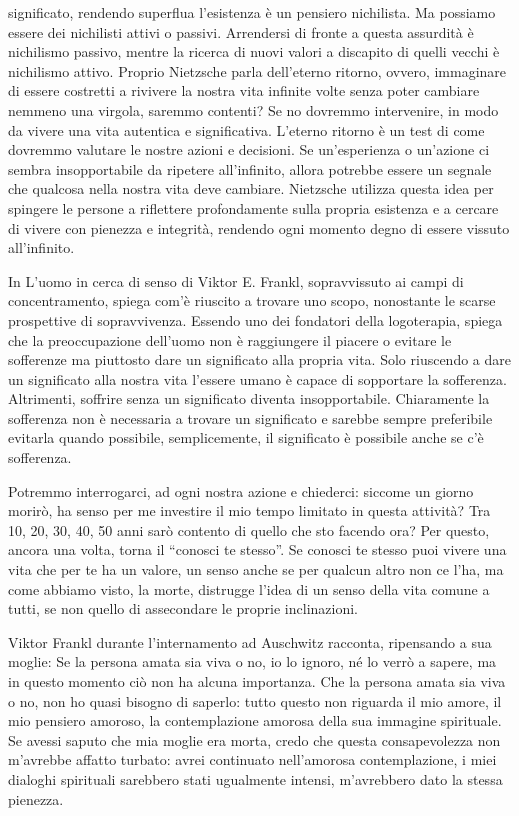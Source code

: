 \documentclass[12pt]{book} %
\begin{document}
significato, rendendo superflua l'esistenza è un pensiero nichilista. Ma possiamo essere dei
nichilisti attivi o passivi. Arrendersi di fronte a questa assurdità è nichilismo passivo, mentre la ricerca di nuovi
valori a discapito di quelli vecchi è nichilismo attivo.
Proprio Nietzsche parla dell'eterno ritorno, ovvero, immaginare di essere costretti a rivivere la nostra vita infinite volte senza poter cambiare nemmeno una virgola, saremmo contenti? Se no dovremmo intervenire, in modo da vivere una vita autentica e significativa. L'eterno ritorno è un test di come dovremmo valutare le nostre azioni e decisioni. Se un'esperienza o un'azione ci sembra insopportabile da ripetere all'infinito, allora potrebbe essere un segnale che qualcosa nella nostra vita deve cambiare. Nietzsche utilizza questa idea per spingere le persone a riflettere profondamente sulla propria esistenza e a cercare di vivere con pienezza e integrità, rendendo ogni momento degno di essere vissuto all'infinito.

In L'uomo in cerca di senso di Viktor E. Frankl, sopravvissuto ai campi di
concentramento, spiega com'è riuscito a trovare uno scopo, nonostante le scarse prospettive di
sopravvivenza. Essendo uno dei fondatori della logoterapia, spiega che la preoccupazione dell'uomo non è raggiungere il
piacere o evitare le sofferenze ma piuttosto dare un significato alla propria vita. Solo riuscendo a dare un
significato alla nostra vita l'essere umano è capace di sopportare la sofferenza. Altrimenti,
soffrire senza un significato diventa insopportabile. Chiaramente la sofferenza non è necessaria a trovare un
significato e sarebbe sempre preferibile evitarla quando possibile, semplicemente, il significato è possibile anche se c'è sofferenza.

Potremmo interrogarci, ad ogni nostra azione e chiederci: siccome un giorno morirò, ha senso per me investire
il mio tempo limitato in questa attività? Tra 10, 20, 30, 40, 50 anni sarò contento di quello che sto facendo ora?
Per questo, ancora una volta, torna il “conosci te stesso”. Se conosci te
stesso puoi vivere una vita che per te ha un valore, un senso anche se per qualcun altro non ce
l'ha, ma come abbiamo visto, la morte, distrugge l'idea di un senso della
vita comune a tutti, se non quello di assecondare le proprie inclinazioni. 

Viktor Frankl durante l'internamento ad Auschwitz racconta, ripensando a sua moglie: Se la persona
amata sia viva o no, io lo ignoro, né lo verrò a sapere, ma in questo momento ciò non ha alcuna importanza. Che la
persona amata sia viva o no, non ho quasi bisogno di saperlo: tutto questo non riguarda il mio amore, il mio pensiero
amoroso, la contemplazione amorosa della sua immagine spirituale. Se avessi saputo che mia moglie era morta, credo che
questa consapevolezza non m'avrebbe affatto turbato: avrei continuato nell'amorosa contemplazione, i miei dialoghi
spirituali sarebbero stati ugualmente intensi, m'avrebbero dato la stessa pienezza. 
\end{document}
